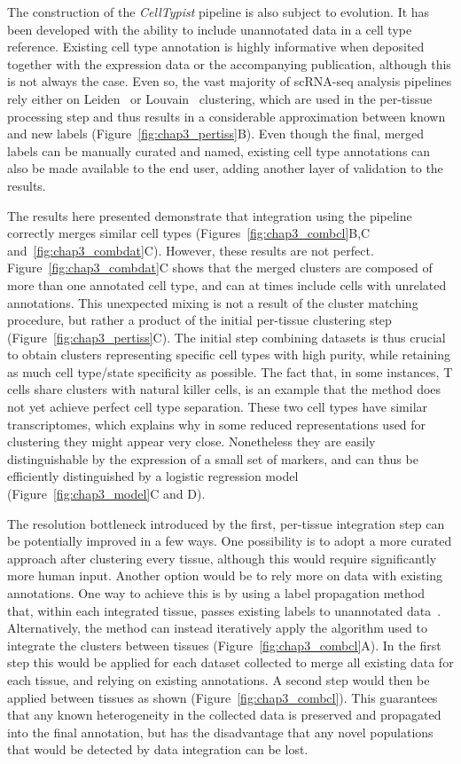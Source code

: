 The construction of the \textit{CellTypist} pipeline is also subject to evolution. It has been developed with the ability to include unannotated data in a cell type reference. Existing cell type annotation is highly informative when deposited together with the expression data or the accompanying publication, although this is not always the case. Even so, the vast majority of scRNA-seq analysis pipelines rely either on Leiden~\citep{traag_louvain_2019} or Louvain~\citep{blondel_fast_2008} clustering, which are used in the per-tissue processing step and thus results in a considerable approximation between known and new labels (Figure~\ref{fig:chap3_pertiss}B). Even though the final, merged labels can be manually curated and named, existing cell type annotations can also be made available to the end user, adding another layer of validation to the results.

The results here presented demonstrate that integration using the pipeline correctly merges similar cell types (Figures~\ref{fig:chap3_combcl}B,C and~\ref{fig:chap3_combdat}C). However, these results are not perfect. Figure~\ref{fig:chap3_combdat}C shows that the merged clusters are composed of more than one annotated cell type, and can at times include cells with unrelated annotations. This unexpected mixing is not a result of the cluster matching procedure, but rather a product of the initial per-tissue clustering step (Figure~\ref{fig:chap3_pertiss}C). The initial step combining datasets is thus crucial to obtain clusters representing specific cell types with high purity, while retaining as much cell type/state specificity as possible. The fact that, in some instances, T cells share clusters with natural killer cells, is an example that the method does not yet achieve perfect cell type separation. These two cell types have similar transcriptomes, which explains why in some reduced representations used for clustering they might appear very close. Nonetheless they are easily distinguishable by the expression of a small set of markers, and can thus be efficiently distinguished by a logistic regression model (Figure~\ref{fig:chap3_model}C and D). 

The resolution bottleneck introduced by the first, per-tissue integration step can be potentially improved in a few ways. One possibility is to adopt a more curated approach after clustering every tissue, although this would require significantly more human input. Another option would be to rely more on data with existing annotations. One way to achieve this is by using a label propagation method that, within each integrated tissue, passes existing labels to unannotated data~\citep{barkas_joint_2019}. Alternatively, the method can instead iteratively apply the algorithm used to integrate the clusters between tissues (Figure~\ref{fig:chap3_combcl}A). In the first step this would be applied for each dataset collected to merge all existing data for each tissue, and relying on existing annotations. A second step would then be applied between tissues as shown (Figure~\ref{fig:chap3_combcl}). This guarantees that any known heterogeneity in the collected data is preserved and propagated into the final annotation, but has the disadvantage that any novel populations that would be detected by data integration can be lost.

